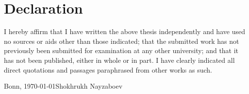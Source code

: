 \documentclass[11pt, a4paper]{article}
\begin{document}





\newpage

\printbibliography[title={References}]
\newpage



\newpage

\section*{Declaration}

I hereby affirm that I have written the above thesis independently and have
used no sources or aids other than those indicated; that the submitted work
has not previously been submitted for examination at any other university;
and that it has not been published, either in whole or in part. I have clearly
indicated all direct quotations and passages paraphrased from other works
as such.

\vspace{2cm}

\noindent Bonn, \today \hfill Shokhrukh Nayzaboev
\end{document}
